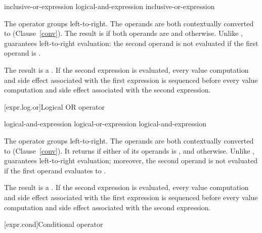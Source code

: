 \begin{bnf}
\br
    inclusive-or-expression\br
    logical-and-expression \terminal{\&\&} inclusive-or-expression
\end{bnf}

\pnum
The \tcode{\&\&} operator groups left-to-right. The operands are both
contextually converted to 
(Clause~\ref{conv}). The
result is  if both operands are  and
 otherwise. Unlike \tcode{\&}, \tcode{\&\&} guarantees
left-to-right evaluation: the second operand is not evaluated if the
first operand is .

\pnum
The result is a .
%
If the second expression is evaluated, every
%
value computation and
side
effect associated with the first expression is sequenced before every
value computation and side effect associated with the second expression.

[expr.log.or]{Logical OR operator}%
%
%
%

\begin{bnf}
\br
    logical-and-expression\br
    logical-or-expression \terminal{$||$} logical-and-expression
\end{bnf}

\pnum
The \tcode{$||$} operator groups left-to-right. The operands are both
contextually converted to 
(Clause~\ref{conv}). It returns
 if either of its operands is , and
 otherwise. Unlike \tcode{$|$}, \tcode{$||$} guarantees
left-to-right evaluation; moreover, the second operand is not evaluated
if the first operand evaluates to .

\pnum
The result is a .
%
If the second expression is evaluated, every
%
value computation and
%
side effect
associated with the first expression is sequenced before every value computation
and side effect associated with the second expression.

[expr.cond]{Conditional operator}%
%
%
%


